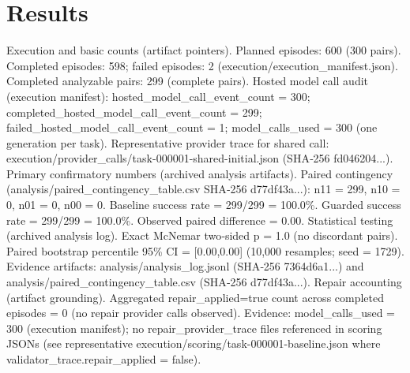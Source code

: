 \documentclass[conference]{IEEEtran}
\begin{document}
\section{Results}
Execution and basic counts (artifact pointers). Planned episodes: 600 (300 pairs). Completed episodes: 598; failed episodes: 2 (execution/execution\_manifest.json). Completed analyzable pairs: 299 (complete pairs). Hosted model call audit (execution manifest): hosted\_model\_call\_event\_count = 300; completed\_hosted\_model\_call\_event\_count = 299; failed\_hosted\_model\_call\_event\_count = 1; model\_calls\_used = 300 (one generation per task). Representative provider trace for shared call: execution/provider\_calls/task-000001-shared-initial.json (SHA‑256 fd046204...).
Primary confirmatory numbers (archived analysis artifacts). Paired contingency (analysis/paired\_contingency\_table.csv SHA‑256 d77df43a...): n11 = 299, n10 = 0, n01 = 0, n00 = 0. Baseline success rate = 299/299 = 100.0\%. Guarded success rate = 299/299 = 100.0\%. Observed paired difference = 0.00.
Statistical testing (archived analysis log). Exact McNemar two‑sided p = 1.0 (no discordant pairs). Paired bootstrap percentile 95\% CI = [0.00,0.00] (10,000 resamples; seed = 1729). Evidence artifacts: analysis/analysis\_log.jsonl (SHA‑256 7364d6a1...) and analysis/paired\_contingency\_table.csv (SHA‑256 d77df43a...).
Repair accounting (artifact grounding). Aggregated repair\_applied=true count across completed episodes = 0 (no repair provider calls observed). Evidence: model\_calls\_used = 300 (execution manifest); no repair\_provider\_trace files referenced in scoring JSONs (see representative execution/scoring/task-000001-baseline.json where validator\_trace.repair\_applied = false).
\end{document}
